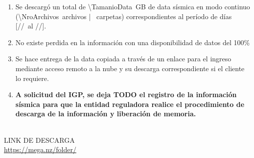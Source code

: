\begin{longtblr}
\begin{enumerate}
    \item Se descargó un total de \num{\TamanioData}~GB de data sísmica en modo continuo (\num{\NroArchivos}~archivos | \NroCarpetas~carpetas) correspondientes al período de \calcularDias{\AnioIni}{\MesIni}{\DiaIni}{\AnioMantto}{\MesMantto}{\DiaIni} días [\DiaIni/\MesIni/\AnioIni~al \DiaMantto/\MesMantto/\AnioMantto].
    \item No existe perdida en la información con una disponibilidad de datos del 100\%
    \item Se hace entrega de la data copiada a través de un enlace para el ingreso mediante acceso remoto a la nube y su descarga correspondiente si el cliente lo requiere.
    \item {\bfseries\color{SuAzul} A solicitud del IGP, se deja TODO el registro de la información sísmica para que la entidad reguladora realice el procedimiento de descarga de la información y liberación de memoria.}
\end{enumerate} \\
%
 LINK DE DESCARGA\\
 {\color{SuAzul}\url{https://mega.nz/folder/}}\\
\end{longtblr}